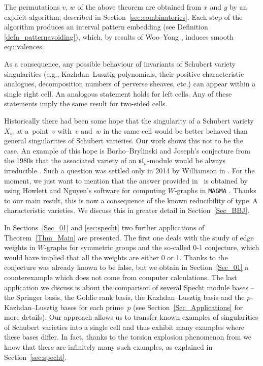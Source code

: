 \documentclass[10pt,a4paper]{amsart}
\numberwithin{equation}{section}
\begin{document}
The permutations $v$, $w$ of the above theorem are obtained from $x$ and $y$ by an explicit algorithm, described in Section~\ref{sec:combinatorics}. Each step of the algorithm produces an interval pattern embedding (see Definition \ref{defn_patternavoiding}), which, by results of Woo--Yong \cite{wooyong}, induces smooth equivalences.

As a consequence, any possible behaviour of invariants of Schubert variety singularities (e.g., Kazhdan--Lusztig polynomials, their positive characteristic analogues, decomposition numbers of perverse sheaves, etc.) can appear within a single right cell. An analogous statement holds for left cells. Any of these statements imply the same result for two-sided cells.

Historically there had been some hope that the singularity of a Schubert variety $X_w$ at a~point~$v$ with~$v$ and~$w$ in the same cell would be better behaved than general singularities of Schubert varieties. Our work shows this not to be the case. An example of this hope is Borho--Brylinski and Joseph's conjecture from the 1980s that the associated variety of an $\mathfrak{sl}_n$-module would be always irreducible \cite{BB,J}. Such a question was settled only in 2014 by Williamson in \cite{williamson}. For the moment, we just want to mention that the answer provided in~\cite{williamson} is obtained by using Howlett and Nguyen's software \cite{HN} for computing $W$-graphs in {\tt MAGMA} \cite{BCP}. Thanks to our main result, this is now a consequence of the known reducibility of type~A characteristic varieties. We discuss this in greater detail in Section~\ref{Sec_BBJ}.

In Sections~\ref{Sec_01} and \ref{sec:specht} two further applications of Theorem~\ref{Thm_Main} are presented. The first one deals with the study of edge weights in $W$-graphs for symmetric groups and the so-called 0-1 conjecture, which would have implied that all the weights are either 0 or 1. Thanks to \cite{mclarnanwarrington} the conjecture was already known to be false, but we obtain in Section~\ref{Sec_01} a counterexample which does not come from computer calculations. The last application we discuss is about the comparison of several Specht module bases -- the Springer basis, the Goldie rank basis, the Kazhdan--Lusztig basis and the $p$-Kazhdan--Lusztig bases for each prime~$p$ (see Section~\ref{Sec_Applications} for more details). Our approach allows us to transfer known examples of singularities of Schubert varieties into a single cell and thus exhibit many examples where these bases differ. In fact, thanks to the torsion explosion phenomenon from \cite{explosion} we know that there are infinitely many such examples, as explained in Section~\ref{sec:specht}.
\end{document}

